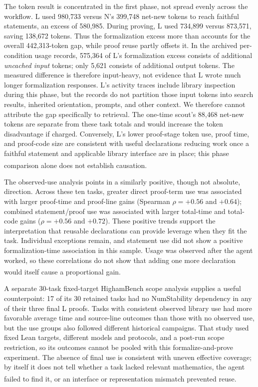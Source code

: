 \documentclass[10pt,a4paper]{article}
\newcommand{\src}[1]{\textsuperscript{\cite{#1}}}
\begin{document}
The token result is concentrated in the first phase, not spread evenly
across the workflow. L used 980,733 versus N's 399,748 net-new tokens to
reach faithful statements, an excess of 580,985. During proving, L used
734,899 versus 873,571, saving 138,672 tokens. Thus the formalization
excess more than accounts for the overall 442,313-token gap, while proof
reuse partly offsets it. In the archived per-condition usage records,
575,364 of L's formalization excess consists of additional \emph{uncached
input} tokens; only 5,621 consists of additional output tokens. The
measured difference is therefore input-heavy, not evidence that L wrote
much longer formalization responses. L's activity traces include library
inspection during this phase, but the records do not partition those
input tokens into search results, inherited orientation, prompts, and
other context. We therefore cannot attribute the gap specifically to
retrieval. The one-time scout's 88,468 net-new tokens are separate from
these task totals and would increase the token disadvantage if charged.
Conversely, L's lower proof-stage token use, proof time, and proof-code
size are consistent with useful declarations reducing work once a
faithful statement and applicable library interface are in place; this
phase comparison alone does not establish causation.
\src{summary,taskledger,evidence,metrics,warmscout}

The observed-use analysis points in a similarly positive, though not
absolute, direction. Across these ten tasks, greater direct proof-term use
was associated with larger proof-time and proof-line gains (Spearman
$\rho=+0.56$ and $+0.64$); combined statement/proof use was associated with
larger total-time and total-code gains ($\rho=+0.56$ and $+0.72$). These
positive trends support the interpretation that reusable declarations can
provide leverage when they fit the task. Individual exceptions remain, and
statement use did not show a positive formalization-time association in
this sample. Usage was observed after the agent worked, so these
correlations do not show that adding one more declaration would itself
cause a proportional gain.\src{phasepoints,usagepoints,taskledger}

A separate 30-task fixed-target HighamBench scope analysis supplies a useful
counterpoint: 17 of its 30 retained tasks had no NumStability dependency in
any of their three final L proofs. Tasks with consistent observed library
use had more favorable average time and source-line outcomes than those
with no observed use, but the use groups also followed different historical
campaigns. That study used fixed Lean targets, different models and
protocols, and a post-run scope restriction, so its outcomes cannot be
pooled with this formalize-and-prove experiment. The absence of final use
is consistent with uneven effective coverage; by itself it does not tell
whether a task lacked relevant mathematics, the agent failed to find it,
or an interface or representation mismatch prevented reuse.\src{scope30}
\end{document}
